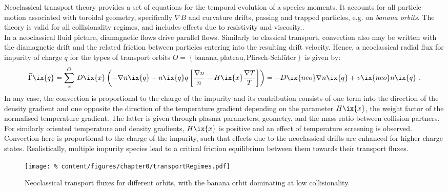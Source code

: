                Neoclassical transport theory provides a set of equations for the temporal evolution of a species moments. It accounts for all particle motion associated with toroidal geometry, specifically $\nabla B$ and curvature drifts, passing and trapped particles, e.g. on \textit{banana orbits}. The theory is valid for all collisionality regimes, and includes effects due to resistivity and viscosity.\cite{Houlberg1997,Tribaldos2005,Fulop2001}.\\%
                In a neoclassical fluid picture, diamagnetic flows drive parallel flows. Similarly to classical transport, convection also may be written with the diamagnetic drift and the related friction between particles entering into the resulting drift velocity. Hence, a neoclassical radial flux for impurity of charge $q$ for the types of transport orbits $O=\left\{\right.$banana,\,plateau,\,Pfirsch-Schlüter$\left.\right\}$ is given by:
%
                \begin{align}%
                    \vec{\Gamma}\ix{q}=\sum^{O}_{x}\,D\ix{x}\left(-\nabla n\ix{q}+n\ix{q}q\left[\frac{\nabla n}{n}-H\ix{x}\frac{\nabla T}{T}\right]\right)=-D\ix{neo}\nabla n\ix{q}+v\ix{neo}n\ix{q}\,\,.\nonumber%
                \end{align}%
%
                In any case, the convection is proportional to the charge of the impurity and its contribution consists of one term into the direction of the density gradient and one opposite the direction of the temperature gradient depending on the parameter $H\ix{x}$, the weight factor of the normalised temperature gradient. The latter is given through plasma parameters, geometry, and the mass ratio between collision partners. For similarly oriented temperature and density gradients, $H\ix{x}$ is positive and an effect of temperature screening is observed. Convection here is proportional to the charge of the impurity, such that effects due to the neoclassical drifts are enhanced for higher charge states. Realistically, multiple impurity species lead to a critical friction equilibrium between them towards their transport fluxes\cite{Dux2000,Dux2004}.\\%
%
                \begin{figure}%
                    \centering%
                    \texttt{[image: \%
                        content/figures/chapter0/transportRegimes.pdf]}%
                    \caption{Neoclassical transport fluxes for different orbits, with the banana orbit dominating at low collisionality.\cite{Helander2012}}\label{fig:neoclassical_transport}%
                \end{figure}%
